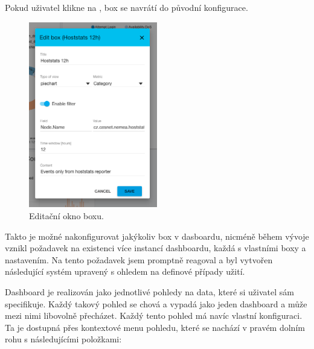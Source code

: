 Pokud uživatel klikne na , box se navrátí do původní konfigurace.

\begin{figure}[ht]
    \centering
    \includegraphics[width=0.5\textwidth]{fig/box_edit.png}
    \caption{Editační okno boxu.} \label{fig:box_edit}
\end{figure}

Takto je možné nakonfigurovat jakýkoliv box v dasboardu, nicméně během vývoje vznikl požadavek na existenci více instancí dashboardu, každá s vlastními boxy a nastavením. Na tento požadavek jsem promptně reagoval a byl vytvořen následující systém upravený s ohledem na definové případy užití.

Dashboard je realizován jako jednotlivé pohledy na data, které si uživatel sám specifikuje. Každý takový pohled se chová a vypadá jako jeden dashboard a může mezi nimi libovolně přecházet. Každý tento pohled má navíc vlastní konfiguraci. Ta je dostupná přes kontextové menu pohledu, které se nachází v pravém dolním rohu s následujícími položkami:

